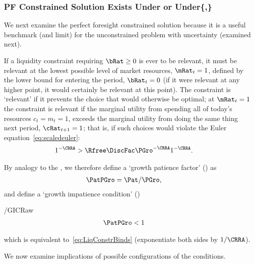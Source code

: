 \documentclass[BufferStockTheory]{subfiles}
\begin{document}
\hypertarget{PF-Constrained-Solution}{}
\hypertarget{Constrained-Solution}{}
\subsubsection{PF Constrained Solution Exists Under \texorpdfstring{{\RIC}}{RIC} or Under\texorpdfstring{\{\cncl{\RIC},\GICRaw\}}{RIC-Fails,GIC}}\label{subsec:PFCon}

We next examine the perfect foresight constrained solution because it is a useful benchmark (and limit) for the unconstrained problem with uncertainty (examined next).

If a liquidity constraint requiring $\bRat \geq 0$ is ever to be relevant, it must be relevant at the lowest possible level of market resources, $\mRat_{t}=1$, defined by the lower bound for entering the period, $\bRat_{t}=0$ (if it were relevant at any higher point, it would certainly be relevant at this point).  The constraint is `relevant' if it prevents the choice that would otherwise be optimal; at $\mRat_{t}=1$ the constraint is relevant if the marginal utility from spending all of today's resources $c_{t}=m_{t}=1$, exceeds the marginal utility from doing the same thing next period, $\cRat_{t+1}=1$; that is, if such choices would violate the Euler equation~\eqref{eq:scaledeuler}:
\begin{align}
  1^{-\CRRA}  & > \Rfree \DiscFac \PGro^{-\CRRA}1^{-\CRRA}  \label{eq:LiqConstrBinds}.
\end{align}

\hypertarget{GPFRaw}{}
\hypertarget{GICRaw}{}
By analogy to the \RPF, we therefore define a `growth patience factor' (\GPFRaw) as
\begin{align}
  \PatPGro  & = {\Pat}/\PGro,  \label{eq:GPFRaw}
\end{align}
and define a `growth impatience condition' (\GICRaw)
\begin{verbatimwrite}{\EqDir/GICRaw}
\begin{align}
  \PatPGro &  < 1   \label{eq:GICRaw}
\end{align}
\end{verbatimwrite}

which is equivalent to~\eqref{eq:LiqConstrBinds} (exponentiate both
sides by $1/\CRRA$).

We now examine implications of possible configurations of the conditions.
\end{document}
